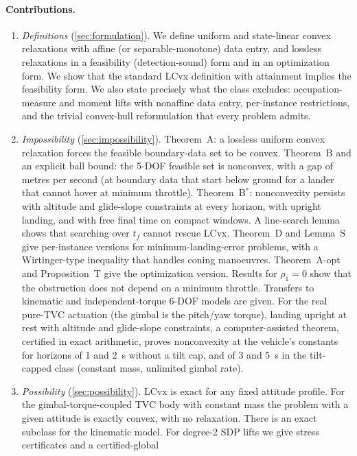 \paragraph{Contributions.}
\begin{enumerate}[leftmargin=*,itemsep=2pt]
\item \emph{Definitions} (\cref{sec:formulation}). We define uniform and state-linear convex relaxations with
affine (or separable-monotone) data entry, and lossless relaxations in a feasibility (detection-sound) form and in
an optimization form. We show that the standard LCvx definition with attainment implies the feasibility form. We also
state precisely what the class excludes: occupation-measure and moment lifts with nonaffine data entry,
per-instance restrictions, and the trivial convex-hull reformulation that every problem admits.
\item \emph{Impossibility} (\cref{sec:impossibility}). Theorem~A: a lossless uniform convex relaxation forces the
feasible boundary-data set to be convex. Theorem~B and an explicit ball bound: the 5-DOF feasible set is nonconvex,
with a gap of metres per second (at boundary data that start below ground for a lander that cannot hover at minimum throttle). Theorem~B$^*$: nonconvexity persists with altitude and glide-slope constraints at
every horizon, with upright landing, and with free final time on compact windows. A line-search lemma shows that
searching over $t_f$ cannot rescue LCvx. Theorem~D and Lemma~S give per-instance versions for minimum-landing-error
problems, with a Wirtinger-type inequality that handles coning manoeuvres. Theorem~A-opt and Proposition~T give the
optimization version. Results for $\rho_1=0$ show that the obstruction does not depend on a minimum throttle.
Transfers to kinematic and independent-torque 6-DOF models are given. For the real pure-TVC actuation (the gimbal is the
pitch/yaw torque), landing upright at rest with altitude and glide-slope constraints, a computer-assisted theorem, certified in
exact arithmetic, proves nonconvexity at the vehicle's constants for horizons of 1 and 2~s without a tilt cap, and of 3 and 5~s in the
tilt-capped class (constant mass, unlimited gimbal rate).
\item \emph{Possibility} (\cref{sec:possibility}). LCvx is exact for any fixed attitude profile. For the
gimbal-torque-coupled TVC body with constant mass the problem with a given attitude is exactly convex, with no relaxation. There is an
exact subclass for the kinematic model. For degree-2 SDP lifts we give stress certificates and a certified-global

\end{enumerate}
